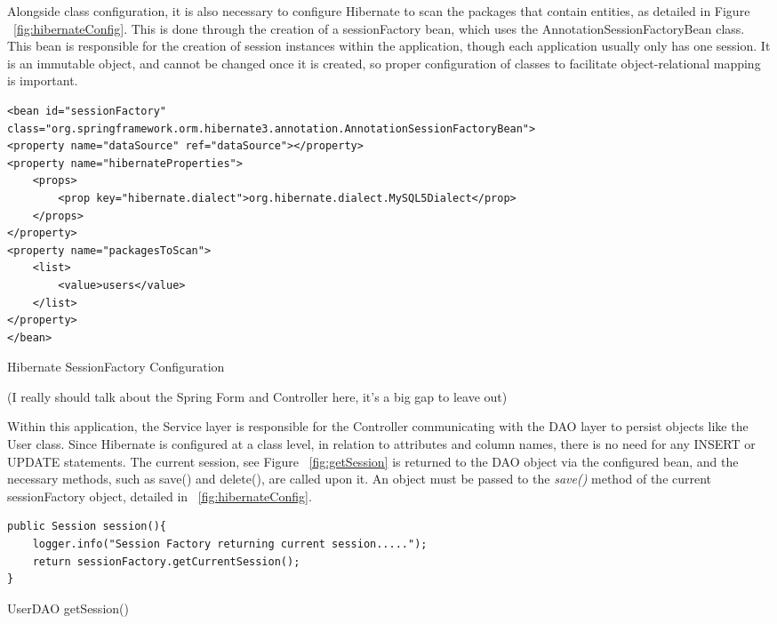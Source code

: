 Alongside class configuration, it is also necessary to configure Hibernate to scan the packages that contain entities, as detailed in Figure ~\ref{fig:hibernateConfig}. This is done through the creation of a sessionFactory bean, which uses the AnnotationSessionFactoryBean class. This bean is responsible for the creation of session instances within the application, though each application usually only has one session. It is an immutable object, and cannot be changed once it is created, so proper configuration of classes to facilitate object-relational mapping is important.

\begin{table}[H]
\begin{lstlisting}
<bean id="sessionFactory"
class="org.springframework.orm.hibernate3.annotation.AnnotationSessionFactoryBean">
<property name="dataSource" ref="dataSource"></property>
<property name="hibernateProperties">
	<props>
		<prop key="hibernate.dialect">org.hibernate.dialect.MySQL5Dialect</prop>
	</props>
</property>
<property name="packagesToScan">
	<list>
		<value>users</value>
	</list>
</property>
</bean>
\end{lstlisting}
\caption{Hibernate SessionFactory Configuration}
\label{fig:hibernateConfig}
\end{table}


(I really should talk about the Spring Form and Controller here, it's a big gap to leave out)



Within this application, the Service layer is responsible for the Controller communicating with the DAO layer to persist objects like the User class. Since Hibernate is configured at a class level, in relation to attributes and column names, there is no need for any INSERT or UPDATE statements. The current session, see Figure ~\ref{fig:getSession} is returned to the DAO object via the configured bean, and the necessary methods, such as save() and delete(), are called upon it. An object must be passed to the \textit{save()} method of the current sessionFactory object, detailed in ~\ref{fig:hibernateConfig}. 

\begin{table}[H]
\begin{lstlisting}
public Session session(){
	logger.info("Session Factory returning current session.....");
	return sessionFactory.getCurrentSession();
}
\end{lstlisting}
\caption{UserDAO getSession()}
\label{fig:getSession}
\end{table}


